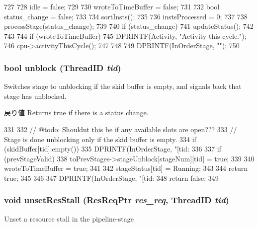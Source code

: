 \begin{DoxyCode}
727 {
728     idle = false;
729     
730     wroteToTimeBuffer = false;
731 
732     bool status_change = false;
733     
734     sortInsts();
735 
736     instsProcessed = 0;
737 
738     processStage(status_change);
739 
740     if (status_change) {
741         updateStatus();
742     }
743 
744     if (wroteToTimeBuffer) {
745         DPRINTF(Activity, "Activity this cycle.\n");
746         cpu->activityThisCycle();
747     }
748 
749     DPRINTF(InOrderStage, "\n\n");
750 }
\end{DoxyCode}
\hypertarget{classPipelineStage_a9cc3b95f6969935f78c0158aa5145021}{
\subsubsection[{unblock}]{\setlength{\rightskip}{0pt plus 5cm}bool unblock ({\bf ThreadID} {\em tid})}}
\label{classPipelineStage_a9cc3b95f6969935f78c0158aa5145021}
Switches stage to unblocking if the skid buffer is empty, and signals back that stage has unblocked. \begin{DoxyReturn}{戻り値}
Returns true if there is a status change. 
\end{DoxyReturn}



\begin{DoxyCode}
331 {
332     // @todo: Shouldnt this be if any available slots are open???
333     // Stage is done unblocking only if the skid buffer is empty.
334     if (skidBuffer[tid].empty()) {
335         DPRINTF(InOrderStage, "[tid:%
336 
337         if (prevStageValid)
338             toPrevStages->stageUnblock[stageNum][tid] = true;
339 
340         wroteToTimeBuffer = true;
341 
342         stageStatus[tid] = Running;
343 
344         return true;
345     }
346 
347     DPRINTF(InOrderStage, "[tid:%
348     return false;
349 }
\end{DoxyCode}
\hypertarget{classPipelineStage_a71090c4bc5fc055eb0ea621cb65fddc8}{
\subsubsection[{unsetResStall}]{\setlength{\rightskip}{0pt plus 5cm}void unsetResStall ({\bf ResReqPtr} {\em res\_\-req}, \/  {\bf ThreadID} {\em tid})}}
\label{classPipelineStage_a71090c4bc5fc055eb0ea621cb65fddc8}
Unset a resource stall in the pipeline-\/stage 


